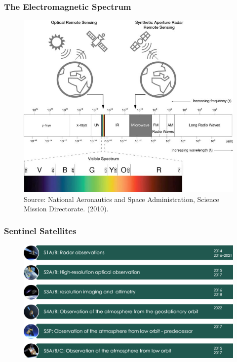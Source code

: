 \documentclass[aspectratio=1610,10pt]{beamer}
\begin{document}
				\begin{frame} \frametitle{\large{The Electromagnetic Spectrum}}%
\begin{figure}[H] 
         \centering
         \includegraphics[scale=0.8]{./Figures/Image_op}%
        \caption*{\tiny{Source: National Aeronautics and Space Administration, Science Mission Directorate. (2010).}}
    \end{figure}
\end{frame}
		
		\begin{frame} \frametitle{\large{Sentinel Satellites}}%
\begin{figure}[H] 
         \centering
         \includegraphics[scale=0.4]{./Figures/sentinel_radar} \vspace{0.1cm}
        \caption*{}
    \end{figure}
\end{frame} 
		
\end{document}
